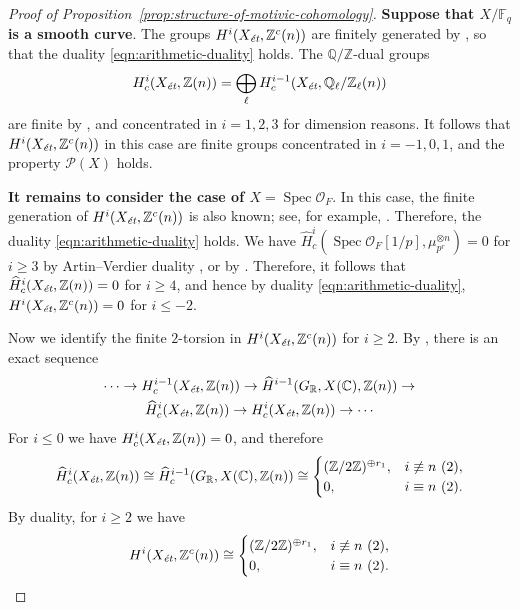\documentclass{article}
\DeclareMathOperator{\Spec}{Spec}
\newcommand{\CC}{\mathbb{C}}
\newcommand{\FF}{\mathbb{F}}
\newcommand{\QQ}{\mathbb{Q}}
\newcommand{\RR}{\mathbb{R}}
\newcommand{\ZZ}{\mathbb{Z}}
\newcommand{\et}{\text{\it \'{e}t}}
\theoremstyle{myplain}
\theoremstyle{mydefinition}
\begin{document}
\begin{proof}[Proof of Proposition~\ref{prop:structure-of-motivic-cohomology}]
  \vspace{1em}

  \textbf{Suppose that $X/\FF_q$ is a smooth curve}. The groups
  $H^i (X_\et, \ZZ^c (n))$ are finitely generated by
  \cite[Proposition~4.3]{Geisser-2017}, so that the duality
  \eqref{eqn:arithmetic-duality} holds. The $\QQ/\ZZ$-dual groups
  \[ H^i_c (X_\et, \ZZ(n)) =
    \bigoplus_\ell H^{i-1}_c (X_\et, \QQ_\ell/\ZZ_\ell (n)) \]
  are finite by \cite[Theorem~3]{Kahn-2003}, and concentrated in $i = 1,2,3$ for
  dimension reasons. It follows that $H^i (X_\et, \ZZ^c (n))$ in this case are
  finite groups concentrated in $i = -1,0,1$, and the property $\mathcal{P} (X)$
  holds.

  \vspace{1em}

  \textbf{It remains to consider the case of $X = \Spec \mathcal{O}_F$}.
  In this case, the finite generation of $H^i (X_\et, \ZZ^c (n))$ is also known;
  see, for example, \cite[Proposition~4.14]{Geisser-2017}. Therefore, the
  duality \eqref{eqn:arithmetic-duality} holds. We have
  $\widehat{H}^i_c (\Spec \mathcal{O}_F [1/p], \mu_{p^r}^{\otimes n}) = 0$ for
  $i \ge 3$ by Artin--Verdier duality \cite[Chapter~II,
  Corollary~3.3]{Milne-ADT}, or by \cite[p.\,268]{Soule-1979}. Therefore, it
  follows that $\widehat{H}^i_c (X_\et, \ZZ (n)) = 0$ for $i \ge 4$, and hence
  by duality \eqref{eqn:arithmetic-duality}, $H^i (X_\et, \ZZ^c (n)) = 0$ for
  $i \le -2$.

  Now we identify the finite $2$-torsion in $H^i (X_\et, \ZZ^c (n))$ for
  $i \ge 2$. By \cite[Lemma~6.14]{Flach-Morin-2018}, there is an exact
  sequence
  \begin{multline}
    \label{eqn:les-Hc-vs-H-hat-c}
    \cdots \to H^{i-1}_c (X_\et, \ZZ (n)) \to
    \widehat{H}^{i-1} (G_\RR, X(\CC), \ZZ (n)) \to \\
    \widehat{H}^i_c (X_\et, \ZZ (n)) \to
    H^i_c (X_\et, \ZZ (n)) \to \cdots
  \end{multline}
  For $i \le 0$ we have $H^i_c (X_\et, \ZZ (n)) = 0$, and therefore
  \[ \widehat{H}^i_c (X_\et, \ZZ (n)) \cong
    \widehat{H}^{i-1}_c (G_\RR, X(\CC), \ZZ (n)) \cong
    \begin{cases}
      (\ZZ/2\ZZ)^{\oplus r_1}, & i\not\equiv n ~ (2), \\
      0, & i\equiv n ~ (2).
    \end{cases} \]
  By duality, for $i \ge 2$ we have
  \[ H^i (X_\et, \ZZ^c (n)) \cong
    \begin{cases}
      (\ZZ/2\ZZ)^{\oplus r_1}, & i\not\equiv n ~ (2), \\
      0, & i\equiv n ~ (2).
    \end{cases} \]


\end{proof}
\end{document}
